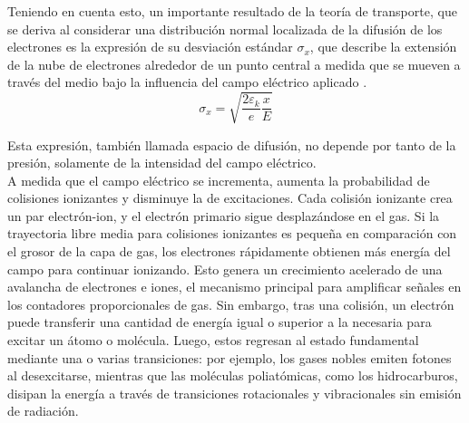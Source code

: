 \documentclass{report}
\begin{document}
\noindent Teniendo en cuenta esto, un importante resultado de la teoría de transporte, que se deriva al considerar una distribución normal localizada de la difusión de los electrones es la expresión de su desviación estándar $\sigma_x$, que describe la extensión de la nube de electrones alrededor de un punto central a medida que se mueven a través del medio bajo la influencia del campo eléctrico aplicado \cite{sauli2015gaseous2}.
\begin{equation}
    \sigma_x=\sqrt{\frac{2 \varepsilon_k}{e} \frac{x}{E}}
\end{equation}

\noindent Esta expresión, también llamada espacio de difusión, no depende por tanto de la presión, solamente de la intensidad del campo eléctrico.\\

\noindent A medida que el campo eléctrico se incrementa, aumenta la probabilidad de colisiones ionizantes y disminuye la de excitaciones. Cada colisión ionizante crea un par electrón-ion, y el electrón primario sigue desplazándose en el gas. Si la trayectoria libre media para colisiones ionizantes es pequeña en comparación con el grosor de la capa de gas, los electrones rápidamente obtienen más energía del campo para continuar ionizando. Esto genera un crecimiento acelerado de una avalancha de electrones e iones, el mecanismo principal para amplificar señales en los contadores proporcionales de gas. Sin embargo, tras una colisión, un electrón puede transferir una cantidad de energía igual o superior a la necesaria para excitar un átomo o molécula. Luego, estos regresan al estado fundamental mediante una o varias transiciones: por ejemplo, los gases nobles emiten fotones al desexcitarse, mientras que las moléculas poliatómicas, como los hidrocarburos, disipan la energía a través de transiciones rotacionales y vibracionales sin emisión de radiación.\\
\end{document}
